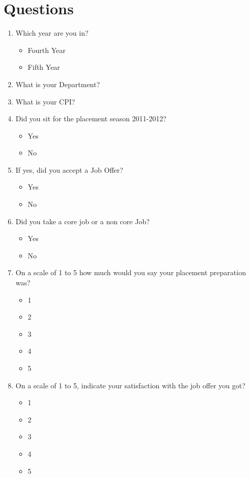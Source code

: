 \documentclass[a4paper,12pt]{report}
\begin{document}
\section{Questions}
\begin{enumerate}
 \item Which year are you in?
  \begin{multicols}{2}
  \begin{itemize}
   \item Fourth Year
   \item Fifth Year
  \end{itemize}
  \end{multicols}
 \item What is your Department?
 \item What is your CPI?
 \item Did you sit for the placement season 2011-2012?
  \begin{multicols}{2}
  \begin{itemize}
   \item Yes
   \item No
  \end{itemize}
  \end{multicols}
 \item If yes, did you accept a Job Offer?
  \begin{multicols}{2}
  \begin{itemize}
   \item Yes
   \item No
  \end{itemize}
  \end{multicols}
 \item Did you take a core job or a non core Job?
  \begin{multicols}{2}
  \begin{itemize}
   \item Yes
   \item No
  \end{itemize}
  \end{multicols}
 \item On a scale of 1 to 5 how much would you say your placement preparation was?
  \begin{multicols}{5}
  \begin{itemize}
   \item 1
   \item 2
   \item 3
   \item 4
   \item 5
  \end{itemize}
  \end{multicols}
 \item On a scale of 1 to 5, indicate your satisfaction with the job offer you got?
  \begin{multicols}{5}
  \begin{itemize}
   \item 1
   \item 2
   \item 3
   \item 4
   \item 5
  \end{itemize}
  \end{multicols}
\end{enumerate}
\end{document}
